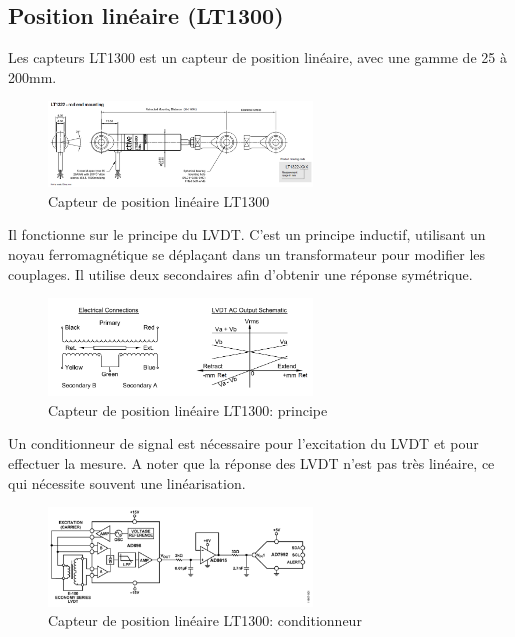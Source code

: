 \subsection{Position linéaire (LT1300)}
Les capteurs LT1300 est un capteur de position linéaire, avec une gamme de 25 à 200mm.


\begin{figure}[h!]
\centering
\includegraphics[width=7cm]{assets/figures/4_2_8_Position_lineaire_LT1300.PNG}
\caption{Capteur de position linéaire LT1300}
\label{fig:Position_lineaire_LT1300}
\end{figure}

Il fonctionne sur le principe du LVDT. C'est un principe inductif, utilisant un noyau ferromagnétique se déplaçant dans un transformateur pour modifier les couplages. Il utilise deux secondaires afin d'obtenir une réponse symétrique.

\begin{figure}[h!]
\centering
\includegraphics[width=7cm]{assets/figures/4_2_8_Position_lineaire_LT1300_detail.PNG}
\caption{Capteur de position linéaire LT1300: principe}
\label{fig:Position_lineaire_LT1300_detail}
\end{figure}

Un conditionneur de signal est nécessaire pour l'excitation du LVDT et pour effectuer la mesure. A noter que la réponse des LVDT n'est pas très linéaire, ce qui nécessite souvent une linéarisation.

\begin{figure}[h!]
\centering
\includegraphics[width=7cm]{assets/figures/4_2_8_Position_lineaire_LT1300_conditionneur.PNG}
\caption{Capteur de position linéaire LT1300: conditionneur}
\label{fig:Position_lineaire_LT1300_conditionneur}
\end{figure}

